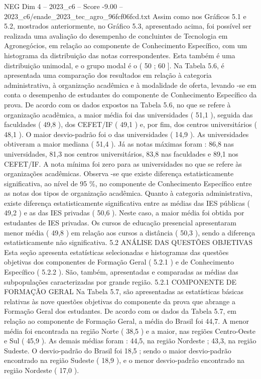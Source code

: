 \begin{textsample}{NEG Dim 4 – 2023\_c6 – Score -9.00 – 2023\_c6/enade\_2023\_tec\_agro\_96fcf06fcd.txt}
Assim como nos Gráficos 5.1 e 5.2, mostrados anteriormente, no Gráfico 5.3, apresentado acima, foi possível ser realizada uma avaliação do desempenho de concluintes de Tecnologia em Agronegócios, em relação ao componente de Conhecimento Específico, com um histograma da distribuição das notas correspondentes.
Esta também é uma distribuição unimodal, e o grupo modal é o ( 50 ; 60 ].
Na Tabela 5.6, é apresentada uma comparação dos resultados em relação à categoria administrativa, à organização acadêmica e à modalidade de oferta, levando -se em conta o desempenho de estudantes do componente de Conhecimento Específico da prova.
De acordo com os dados expostos na Tabela 5.6, no que se refere à organização acadêmica, a maior média foi das universidades ( 51,1 ), seguida das faculdades ( 49,8 ), dos CEFET/IF ( 49,1 ) e, por fim, dos centros universitários ( 48,1 ).
O maior desvio-padrão foi o das universidades ( 14,9 ).
As universidades obtiveram a maior mediana ( 51,4 ).
Já as notas máximas foram : 86,8 nas universidades, 81,3 nos centros universitários, 83,8 nas faculdades e 89,1 nos CEFET/IF.
A nota mínima foi zero para as universidades no que se refere às organizações acadêmicas.
Observa -se que existe diferença estatisticamente significativa, ao nível de 95 \%, no componente de Conhecimento Específico entre as notas dos tipos de organização acadêmica.
Quanto à categoria administrativa, existe diferença estatisticamente significativa entre as médias das IES públicas ( 49,2 ) e as das IES privadas ( 50,6 ).
Neste caso, a maior média foi obtida por estudantes de IES privadas.
Os cursos de educação presencial apresentaram menor média ( 49,8 ) em relação aos cursos a distância ( 50,3 ), sendo a diferença estatisticamente não significativa. 5.2 ANÁLISE DAS QUESTÕES OBJETIVAS Esta seção apresenta estatísticas selecionadas e histogramas das questões objetivas dos componentes de Formação Geral ( 5.2.1 ) e de Conhecimento Específico ( 5.2.2 ).
São, também, apresentadas e comparadas as médias das subpopulações caracterizadas por grande região. 5.2.1 COMPONENTE DE FORMAÇÃO GERAL Na Tabela 5.7, são apresentadas as estatísticas básicas relativas às nove questões objetivas do componente da prova que abrange a Formação Geral dos estudantes.
De acordo com os dados da Tabela 5.7, em relação ao componente de Formação Geral, a média do Brasil foi 44,7.
A menor média foi encontrada na região Norte ( 38,5 ) e a maior, nas regiões Centro-Oeste e Sul ( 45,9 ).
As demais médias foram : 44,5, na região Nordeste ; 43,3, na região Sudeste.
O desvio-padrão do Brasil foi 18,5 ; sendo o maior desvio-padrão encontrado na região Sudeste ( 18,9 ), e o menor desvio-padrão encontrado na região Nordeste ( 17,0 ).

\end{textsample}
